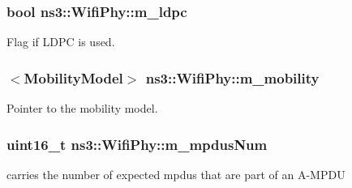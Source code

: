 \subsubsection[{\texorpdfstring{m\+\_\+ldpc}{m_ldpc}}]{\setlength{\rightskip}{0pt plus 5cm}bool ns3\+::\+Wifi\+Phy\+::m\+\_\+ldpc\hspace{0.3cm}{\ttfamily [private]}}\hypertarget{classns3_1_1WifiPhy_a2315db653cc8dbd081cdb0577ad96d19}{}\label{classns3_1_1WifiPhy_a2315db653cc8dbd081cdb0577ad96d19}


Flag if L\+D\+PC is used. 

\subsubsection[{\texorpdfstring{m\+\_\+mobility}{m_mobility}}]{$<${\bf Mobility\+Model}$>$ ns3\+::\+Wifi\+Phy\+::m\+\_\+mobility\hspace{0.3cm}{\ttfamily [private]}}\hypertarget{classns3_1_1WifiPhy_a06d54d4a848b9cd20262b12cb5f68d58}{}\label{classns3_1_1WifiPhy_a06d54d4a848b9cd20262b12cb5f68d58}


Pointer to the mobility model. 

\subsubsection[{\texorpdfstring{m\+\_\+mpdus\+Num}{m_mpdusNum}}]{\setlength{\rightskip}{0pt plus 5cm}uint16\+\_\+t ns3\+::\+Wifi\+Phy\+::m\+\_\+mpdus\+Num\hspace{0.3cm}{\ttfamily [protected]}}\hypertarget{classns3_1_1WifiPhy_aea15140c77315a8bf71eff068ea6570e}{}\label{classns3_1_1WifiPhy_aea15140c77315a8bf71eff068ea6570e}


carries the number of expected mpdus that are part of an A-\/\+M\+P\+DU 

